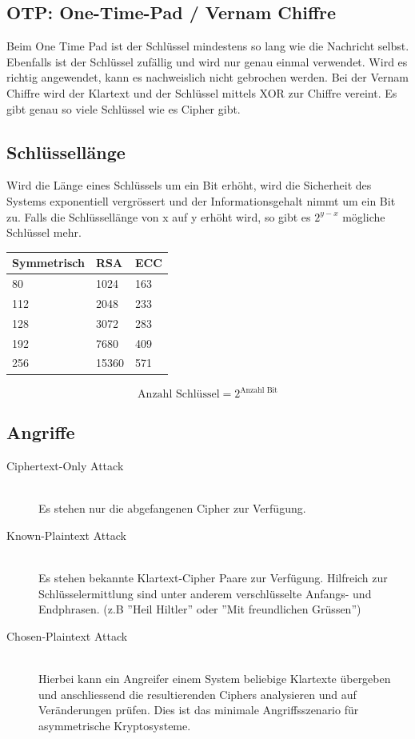 \subsection{OTP: One-Time-Pad / Vernam Chiffre}
Beim One Time Pad ist der Schlüssel mindestens so lang wie die Nachricht selbst. Ebenfalls ist der Schlüssel zufällig und wird nur genau einmal verwendet. Wird es richtig angewendet, kann es nachweislich nicht gebrochen werden. Bei der Vernam Chiffre wird der Klartext und der Schlüssel mittels XOR zur Chiffre vereint. Es gibt genau so viele Schlüssel wie es Cipher gibt. 

\subsection{Schlüssellänge}
Wird die Länge eines Schlüssels um ein Bit erhöht, wird die Sicherheit des Systems exponentiell vergrössert und der Informationsgehalt nimmt um ein Bit zu. Falls die Schlüssellänge von x auf y erhöht wird, so gibt es $2^{y-x}$ mögliche Schlüssel mehr.

\begin{tabular}{|l|l|l|}
	\hline Symmetrisch & RSA & ECC \\ 
	\hline 80  & 1024  & 163 \\ 
	\hline 112 & 2048  & 233 \\ 
	\hline 128 & 3072  & 283 \\ 
	\hline 192 & 7680  & 409 \\ 
	\hline 256 & 15360 & 571 \\ 
	\hline 
\end{tabular} 

\[
	\text{Anzahl Schlüssel} = 2^{\text{Anzahl Bit}} 
\]

\subsection{Angriffe}
\begin{description}
	\item[Ciphertext-Only Attack] \hfill \\
	Es stehen nur die abgefangenen Cipher zur Verfügung.
	\item[Known-Plaintext Attack] \hfill \\
	Es stehen bekannte Klartext-Cipher Paare zur Verfügung. Hilfreich zur Schlüsselermittlung sind unter anderem verschlüsselte Anfangs- und Endphrasen. (z.B ''Heil Hiltler'' oder ''Mit freundlichen Grüssen'') 
	\item[Chosen-Plaintext Attack] \hfill \\
	Hierbei kann ein Angreifer einem System beliebige Klartexte übergeben und anschliessend die resultierenden Ciphers analysieren und auf Veränderungen prüfen. Dies ist das minimale Angriffsszenario für asymmetrische Kryptosysteme.
\end{description}

